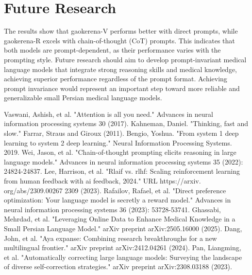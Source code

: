 \documentclass[conference]{IEEEtran}
\begin{document}
\section{Future Research}
The results show that gaokerena-V performs better with direct prompts, while gaokerena-R excels with chain-of-thought (CoT) prompts.  
This indicates that both models are prompt-dependent, as their performance varies with the prompting style.  
Future research should aim to develop prompt-invariant medical language models that integrate strong reasoning skills and medical knowledge, achieving superior performance regardless of the prompt format.  
Achieving prompt invariance would represent an important step toward more reliable and generalizable small Persian medical language models.


	
	
	\begin{thebibliography}{00}
              Vaswani, Ashish, et al. "Attention is all you need." Advances in neural information processing systems 30 (2017).
              Kahneman, Daniel. "Thinking, fast and slow." Farrar, Straus and Giroux (2011).
              Bengio, Yoshua. "From system 1 deep learning to system 2 deep learning." Neural Information Processing Systems. 2019. 
              Wei, Jason, et al. "Chain-of-thought prompting elicits reasoning in large language models." Advances in neural information processing systems 35 (2022): 24824-24837.
              Lee, Harrison, et al. "Rlaif vs. rlhf: Scaling reinforcement learning from human feedback with ai feedback, 2024." URL https://arxiv. org/abs/2309.00267 2309 (2023).
             Rafailov, Rafael, et al. "Direct preference optimization: Your language model is secretly a reward model." Advances in neural information processing systems 36 (2023): 53728-53741.
             Ghassabi, Mehrdad, et al. "Leveraging Online Data to Enhance Medical Knowledge in a Small Persian Language Model." arXiv preprint arXiv:2505.16000 (2025).
             Dang, John, et al. "Aya expanse: Combining research breakthroughs for a new multilingual frontier." arXiv preprint arXiv:2412.04261 (2024).
             Pan, Liangming, et al. "Automatically correcting large language models: Surveying the landscape of diverse self-correction strategies." arXiv preprint arXiv:2308.03188 (2023).

\end{thebibliography}
\end{document}
